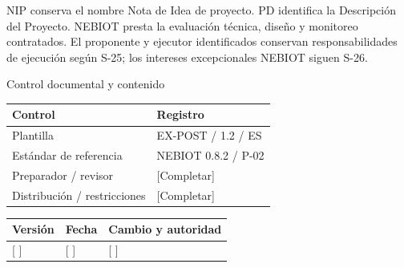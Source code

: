 \vspace{2mm}
NIP conserva el nombre Nota de Idea de proyecto. PD identifica la Descripción del Proyecto.
\vspace{2mm}
NEBIOT presta la evaluación técnica, diseño y monitoreo contratados. El proponente y ejecutor identificados conservan responsabilidades de ejecución según S-25; los intereses excepcionales NEBIOT siguen S-26.
\clearpage
{\fontsize{23}{27}\selectfont\color{NEBGreen}Control documental y contenido\par}
\vspace{3mm}
{\sffamily\fontsize{8.3}{10.3}\selectfont\begin{longtable}{@{}P{50.55mm} P{117.94mm}@{}}
\toprule
\textbf{Control} & \textbf{Registro}\\\midrule\endhead
\rule{0pt}{7.7mm}Plantilla & EX-POST / 1.2 / ES\\\hline
\rule{0pt}{7.7mm}Estándar de referencia & NEBIOT 0.8.2 / P-02\\\hline
\rule{0pt}{7.7mm}Preparador / revisor & [Completar]\\\hline
\rule{0pt}{7.7mm}Distribución / restricciones & [Completar]\\\hline
\end{longtable}}
{\sffamily\fontsize{8.3}{10.3}\selectfont\begin{longtable}{@{}P{31.34mm} P{37.94mm} P{95.68mm}@{}}
\toprule
\textbf{Versión} & \textbf{Fecha} & \textbf{Cambio y autoridad}\\\midrule\endhead
\rule{0pt}{7.7mm}[ ] & [ ] & [ ]\\\hline
\end{longtable}}
{\sffamily\fontsize{9.5}{11.4}\selectfont\tableofcontents}

